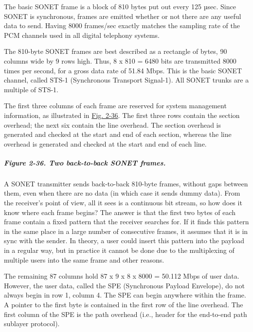 \documentclass[b5paper,11pt]{memoir}
\begin{document}
The basic SONET frame is a block of 810 bytes put out every 125 µsec.
Since SONET is synchronous, frames are emitted whether or not there are
any useful data to send. Having 8000 frames/sec exactly matches the
sampling rate of the PCM channels used in all digital telephony systems.

The 810-byte SONET frames are best described as a rectangle of bytes, 90
columns wide by 9 rows high. Thus, 8 x 810 = 6480 bits are transmitted
8000 times per second, for a gross data rate of 51.84 Mbps. This is the
basic SONET channel, called {STS-1} ({Synchronous Transport Signal-1}).
All SONET trunks are a multiple of STS-1.

The first three columns of each frame are reserved for system management
information, as illustrated in
\protect\hyperlink{0130661023_ch02lev1sec5.htmlux5cux23ch02fig36}{Fig.
2-36}. The first three rows contain the section overhead; the next six
contain the line overhead. The section overhead is generated and checked
at the start and end of each section, whereas the line overhead is
generated and checked at the start and end of each line.

\subparagraph[Figure 2-36. Two back-to-back SONET
frames.]{\texorpdfstring{\protect\hypertarget{0130661023_ch02lev1sec5.htmlux5cux23ch02fig36}{}{}Figure
2-36. Two back-to-back SONET
frames.}{Figure 2-36. Two back-to-back SONET frames.}}


A SONET transmitter sends back-to-back 810-byte frames, without gaps
between them, even when there are no data (in which case it sends dummy
data). From the receiver's point of view, all it sees is a continuous
bit stream, so how does it know where each frame begins? The answer is
that the first two bytes of each frame contain a fixed pattern that the
receiver searches for. If it finds this pattern in the same place in a
large number of consecutive frames, it assumes that it is in sync with
the sender. In theory, a user could insert this pattern into the payload
in a regular way, but in practice it cannot be done due to the
multiplexing of multiple users into the same frame and other reasons.

The remaining 87 columns hold 87 x 9 x 8 x 8000 = 50.112 Mbps of user
data. However, the user data, called the {SPE} ({Synchronous Payload
Envelope}), do not always begin in row 1, column 4. The SPE can begin
anywhere within the frame. A pointer to the first byte is contained in
the first row of the line overhead. The first column of the SPE is the
path overhead (i.e., header for the end-to-end path sublayer protocol).
\end{document}
